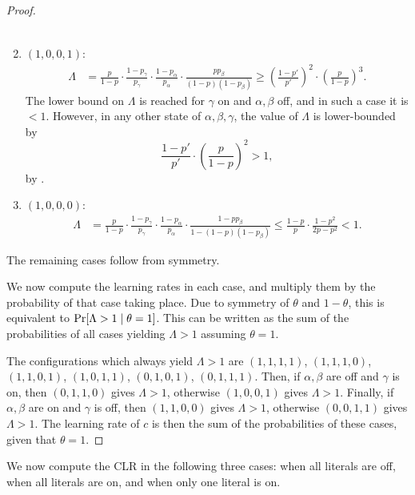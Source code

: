 \begin{proof}
\begin{enumerate}[ ]
\begin{align*}
        \end{align*}
        \item $ \left( 1,0,0,1 \right) $: \begin{align*}
                \Lambda &= \frac{p}{1-p} \cdot \frac{1-p_\gamma}{p_\gamma} \cdot \frac{1-p_\alpha}{p_\alpha} \cdot \frac{pp_\beta}{\left( 1-p \right)\left( 1-p_\beta \right)} \geq \left( \frac{1-p'}{p'} \right)^2 \cdot \left( \frac{p}{1-p} \right)^3.
        \end{align*}
        The lower bound on $ \Lambda $ is reached for $ \gamma $ on and $ \alpha, \beta $ off, and in such a case it is $ <1 $.
        However, in any other state of $ \alpha, \beta, \gamma $, the value of $ \Lambda $ is lower-bounded by \[
             \frac{1-p'}{p'} \cdot \left( \frac{p}{1-p} \right)^2 > 1,
        \]
        by .
        \item $ \left( 1,0,0,0 \right) $: \begin{align*}
                \Lambda &= \frac{p}{1-p} \cdot \frac{1-p_\gamma}{p_\gamma} \cdot \frac{1-p_\alpha}{p_\alpha} \cdot \frac{1-pp_\beta}{1-\left( 1-p \right)\left( 1-p_\beta \right)} \leq \frac{1-p}{p} \cdot \frac{1-p^2}{2p-p^2}<1.
        \end{align*}
    \end{enumerate}
    The remaining cases follow from symmetry.

    We now compute the learning rates in each case, and multiply them by the probability of that case taking place.
    Due to symmetry of $ \theta $ and $ 1-\theta $, this is equivalent to $\Pr\!\left[ \Lambda > 1 \mid \theta = 1 \right]$.
    This can be written as the sum of the probabilities of all cases yielding $ \Lambda > 1 $ assuming $ \theta = 1 $.

    The configurations which always yield $ \Lambda > 1 $ are $ \left( 1,1,1,1 \right)$, $(1,1,1,0)$, $(1,1,0,1)$, $(1,0,1,1)$, $(0,1,0,1)$, $(0,1,1,1) $.
    Then, if $ \alpha,\beta $ are off and $ \gamma $ is on, then $ (0,1,1,0) $ gives $ \Lambda > 1 $, otherwise $ (1,0,0,1) $ gives $ \Lambda > 1 $.
    Finally, if $ \alpha,\beta $ are on and $ \gamma $ is off, then $ (1,1,0,0) $ gives $ \Lambda > 1 $, otherwise $ (0,0,1,1) $ gives $ \Lambda > 1 $.
    The learning rate of $ c $ is then the sum of the probabilities of these cases, given that $ \theta = 1 $.
\end{proof}


We now compute the CLR in the following three cases: when all literals are off, when all literals are on, and when only one literal is on.

